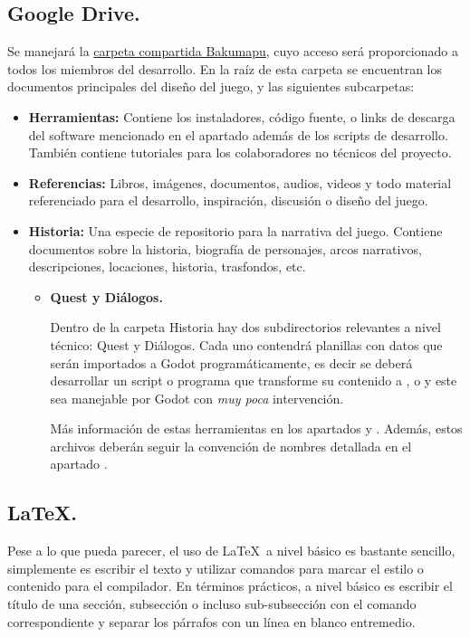 \subsection{Google Drive.}\label{flujo:google-drive}
Se manejará la \href{https://drive.google.com/open?id=1p8u-1UpXts8OHGRHEZLSIiQrqqx0Y4Kt}{carpeta compartida Bakumapu}, cuyo acceso será proporcionado a todos los miembros del desarrollo. En la raíz de esta carpeta se encuentran los documentos principales del diseño del juego, y las siguientes subcarpetas:
\begin{itemize}
	\item \textbf{Herramientas:} Contiene los instaladores, código fuente, o links de descarga del software mencionado en el apartado  además de los scripts de desarrollo. También contiene tutoriales para los colaboradores no técnicos del proyecto.
	\item \textbf{Referencias:} Libros, imágenes, documentos, audios, videos y todo material referenciado para el desarrollo, inspiración, discusión o diseño del juego.
	\item \textbf{Historia:} Una especie de repositorio para la narrativa del juego. Contiene documentos sobre la historia, biografía de personajes, arcos narrativos, descripciones, locaciones, historia, trasfondos, etc.
	\begin{itemize}
		\item \textbf{Quest y Diálogos.}
		
		Dentro de la carpeta Historia hay dos subdirectorios relevantes a nivel técnico: Quest y Diálogos. Cada uno contendrá planillas con datos que serán importados a Godot programáticamente, es decir se deberá desarrollar un script o programa que transforme su contenido a ,  o  y este sea manejable por Godot con \emph{muy poca} intervención.
		
		Más información de estas herramientas en los apartados  y . Además, estos archivos deberán seguir la convención de nombres detallada en el apartado .
	\end{itemize}
\end{itemize}


\subsection{LaTeX.}\label{flujo:latex}
Pese a lo que pueda parecer, el uso de \LaTeX\ a nivel básico es bastante sencillo, simplemente es escribir el texto y utilizar comandos para marcar el estilo o contenido para el compilador. En términos prácticos, a nivel básico es escribir el título de una sección, subsección o incluso sub-subsección con el comando correspondiente y separar los párrafos con un línea en blanco entremedio.

